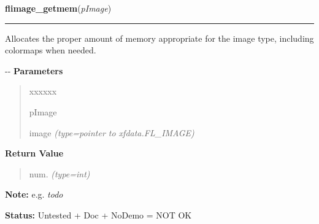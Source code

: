 \hspace{.8\funcindent}\begin{boxedminipage}{\funcwidth}

    \raggedright \textbf{flimage\_getmem}(\textit{pImage})

    \vspace{-1.5ex}

    \rule{\textwidth}{0.5\fboxrule}
\setlength{\parskip}{2ex}

Allocates the proper amount of memory appropriate for the image type,
including colormaps when needed.

-{}-
\setlength{\parskip}{1ex}
      \textbf{Parameters}
      \vspace{-1ex}

      \begin{quote}
        \begin{Ventry}{xxxxxx}

          \item[pImage]


image
            {\it (type=pointer to xfdata.FL\_IMAGE)}

        \end{Ventry}

      \end{quote}

      \textbf{Return Value}
    \vspace{-1ex}

      \begin{quote}

num.
      {\it (type=int)}

      \end{quote}

\textbf{Note:} 
e.g. \emph{todo}


\textbf{Status:} 
Untested + Doc + NoDemo = NOT OK


    \end{boxedminipage}

    \label{xformslib:flflimage:flimage_is_supported}

    \vspace{0.5ex}

